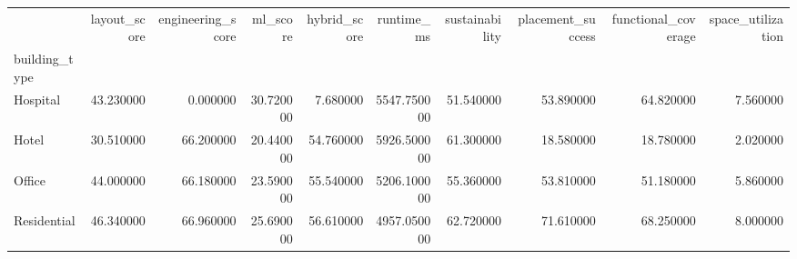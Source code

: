 \begin{tabular}{lrrrrrrrrr}
 & layout_score & engineering_score & ml_score & hybrid_score & runtime_ms & sustainability & placement_success & functional_coverage & space_utilization \\
building_type &  &  &  &  &  &  &  &  &  \\
Hospital & 43.230000 & 0.000000 & 30.720000 & 7.680000 & 5547.750000 & 51.540000 & 53.890000 & 64.820000 & 7.560000 \\
Hotel & 30.510000 & 66.200000 & 20.440000 & 54.760000 & 5926.500000 & 61.300000 & 18.580000 & 18.780000 & 2.020000 \\
Office & 44.000000 & 66.180000 & 23.590000 & 55.540000 & 5206.100000 & 55.360000 & 53.810000 & 51.180000 & 5.860000 \\
Residential & 46.340000 & 66.960000 & 25.690000 & 56.610000 & 4957.050000 & 62.720000 & 71.610000 & 68.250000 & 8.000000 \\
\end{tabular}
